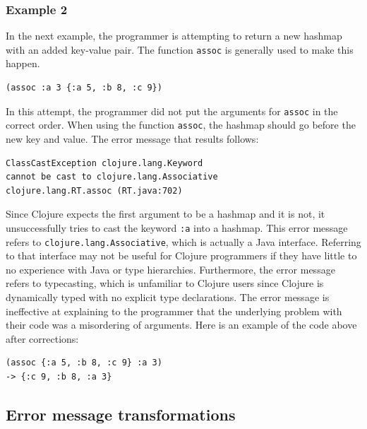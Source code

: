 \documentclass[12pt]{article}
\newcommand{\comment}[1]{{\bf \tt  {#1}}}
\newcommand{\emcomment}[1]{\textcolor{ForestGreen}{\comment{Elena: {#1}}}}
\begin{document}
\subsubsection{Example 2}\label{sec:ex2}

In the next example, the programmer is attempting to return a new hashmap with an added key-value pair.
The function \texttt{assoc} is generally used to make this happen.
\begin{verbatim}
(assoc :a 3 {:a 5, :b 8, :c 9})
\end{verbatim}

In this attempt, the programmer did not put the arguments for \texttt{assoc} in the correct order.
When using the function \texttt{assoc}, the hashmap should go before the new key and value.
The error message that results follows:

\begin{verbatim}
ClassCastException clojure.lang.Keyword 
cannot be cast to clojure.lang.Associative
clojure.lang.RT.assoc (RT.java:702)
\end{verbatim}

Since Clojure expects the first argument to be a hashmap and it is not, it unsuccessfully tries to cast the keyword \texttt{:a} into a hashmap.
This error message refers to \texttt{clojure.lang.Associative}, which is actually a Java interface.
Referring to that interface may not be useful for Clojure programmers if they have little to no experience with Java or type hierarchies.
Furthermore, the error message refers to typecasting, which is unfamiliar to Clojure users since Clojure is dynamically typed with no explicit type declarations.
The error message is ineffective at explaining to the programmer that the underlying problem with their code was a misordering of arguments.
Here is an example of the code above after corrections:
 
\begin{verbatim}
(assoc {:a 5, :b 8, :c 9} :a 3)
-> {:c 9, :b 8, :a 3}
\end{verbatim}


\subsection{Error message transformations}\label{sec:transform}
\end{document}
